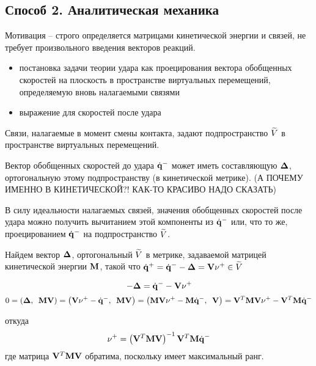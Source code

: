 
\subsection{Способ 2. Аналитическая механика}

Мотивация -- строго определяется матрицами кинетической энергии и связей, не требует произвольного введения векторов реакций.

\begin{itemize}
    \item постановка задачи теории удара как проецирования вектора обобщенных скоростей на плоскость в пространстве виртуальных перемещений, определяемую вновь налагаемыми связями
    \item выражение для скоростей после удара
\end{itemize}

Связи, налагаемые в момент смены контакта, задают подпространство $\widetilde{V}$ в пространстве виртуальных перемещений.

Вектор обобщенных скоростей до удара $\dot{\mathbf{q}}^-$ может иметь составляющую $\mathbf{\Delta}$, ортогональную этому подпространству (в кинетической метрике). (А ПОЧЕМУ ИМЕННО В КИНЕТИЧЕСКОЙ?! КАК-ТО КРАСИВО НАДО СКАЗАТЬ)

В силу идеальности налагаемых связей, значения обобщенных скоростей после удара можно получить вычитанием этой компоненты из $\dot{\mathbf{q}}^-$ или, что то же, проецированием $\dot{\mathbf{q}}^-$ на подпространство $\widetilde{V}$.

Найдем вектор $\mathbf{\Delta}$, ортогональный $\widetilde{V}$ в метрике, задаваемой матрицей кинетической энергии $\mathbf{M}$, такой что $\dot{\mathbf{q}}^+ = \dot{\mathbf{q}}^- - \mathbf{\Delta} = \mathbf{V}\mathbf{\nu}^+ \in \widetilde{V}$

\begin{equation*}
-\mathbf{\Delta} = \dot{\mathbf{q}}^- - \mathbf{V}\mathbf{\nu}^+
\end{equation*}
\begin{equation*}
0 = \left( \mathbf{\Delta}, \enspace \mathbf{M}\mathbf{V} \right) = \left( \mathbf{V}\mathbf{\nu}^+ - \dot{\mathbf{q}}^-, \enspace \mathbf{M}\mathbf{V} \right) = \left( \mathbf{M}\mathbf{V}\mathbf{\nu}^+ - \mathbf{M}\dot{\mathbf{q}}^-, \enspace \mathbf{V} \right) = \mathbf{V}^T\mathbf{M}\mathbf{V}\mathbf{\nu}^+ - \mathbf{V}^T\mathbf{M}\dot{\mathbf{q}}^-
\end{equation*}

откуда
\begin{equation*}
\mathbf{\nu}^+ = \left( \mathbf{V}^T\mathbf{M}\mathbf{V} \right)^{-1}\mathbf{V}^T\mathbf{M}\dot{\mathbf{q}}^-
\end{equation*}
где матрица $\mathbf{V}^T\mathbf{M}\mathbf{V}$ обратима, поскольку имеет максимальный ранг.